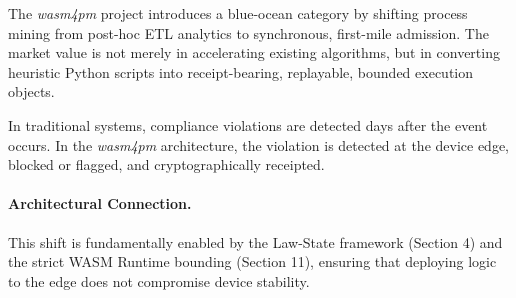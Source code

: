 The \textit{wasm4pm} project introduces a blue-ocean category by shifting process mining from post-hoc ETL analytics to synchronous, first-mile admission. The market value is not merely in accelerating existing algorithms, but in converting heuristic Python scripts into receipt-bearing, replayable, bounded execution objects.

In traditional systems, compliance violations are detected days after the event occurs. In the \textit{wasm4pm} architecture, the violation is detected at the device edge, blocked or flagged, and cryptographically receipted. 

\paragraph{Architectural Connection.}
This shift is fundamentally enabled by the Law-State framework (Section 4) and the strict WASM Runtime bounding (Section 11), ensuring that deploying logic to the edge does not compromise device stability.
